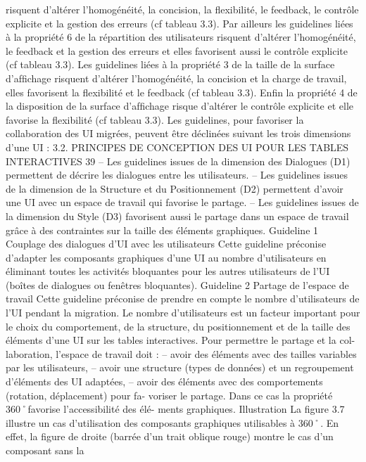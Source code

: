 \documentclass{article}
\begin{document}
risquent d’altérer l’homogénéité, la concision, la ﬂexibilité, le feedback, le contrôle explicite et la
gestion des erreurs (cf tableau 3.3). Par ailleurs les guidelines liées à la propriété 6 de la répartition
des utilisateurs risquent d’altérer l’homogénéité, le feedback et la gestion des erreurs et elles favorisent
aussi le contrôle explicite (cf tableau 3.3). Les guidelines liées à la propriété 3 de la taille de la surface
d’afﬁchage risquent d’altérer l’homogénéité, la concision et la charge de travail, elles favorisent la
ﬂexibilité et le feedback (cf tableau 3.3). Enﬁn la propriété 4 de la disposition de la surface d’afﬁchage
risque d’altérer le contrôle explicite et elle favorise la ﬂexibilité (cf tableau 3.3).
Les guidelines, pour favoriser la collaboration des UI migrées, peuvent être déclinées suivant les
trois dimensions d’une UI :
3.2. PRINCIPES DE CONCEPTION DES UI POUR LES TABLES INTERACTIVES
39
– Les guidelines issues de la dimension des Dialogues (D1) permettent de décrire les dialogues
entre les utilisateurs.
– Les guidelines issues de la dimension de la Structure et du Positionnement (D2) permettent
d’avoir une UI avec un espace de travail qui favorise le partage.
– Les guidelines issues de la dimension du Style (D3) favorisent aussi le partage dans un espace
de travail grâce à des contraintes sur la taille des éléments graphiques.
Guideline 1 Couplage des dialogues d’UI avec les utilisateurs
Cette guideline préconise d’adapter les composants graphiques d’une UI au
nombre d’utilisateurs en éliminant toutes les activités bloquantes pour les autres
utilisateurs de l’UI (boîtes de dialogues ou fenêtres bloquantes).
Guideline 2 Partage de l’espace de travail
Cette guideline préconise de prendre en compte le nombre d’utilisateurs de l’UI
pendant la migration. Le nombre d’utilisateurs est un facteur important pour le
choix du comportement, de la structure, du positionnement et de la taille des
éléments d’une UI sur les tables interactives. Pour permettre le partage et la col-
laboration, l’espace de travail doit :
– avoir des éléments avec des tailles variables par les utilisateurs,
– avoir une structure (types de données) et un regroupement d’éléments des UI
adaptées,
– avoir des éléments avec des comportements (rotation, déplacement) pour fa-
voriser le partage. Dans ce cas la propriété 360˚favorise l’accessibilité des élé-
ments graphiques.
Illustration
La ﬁgure 3.7 illustre un cas d’utilisation des composants graphiques utilisables à 360˚.
En effet, la ﬁgure de droite (barrée d’un trait oblique rouge) montre le cas d’un composant sans la
\end{document}

